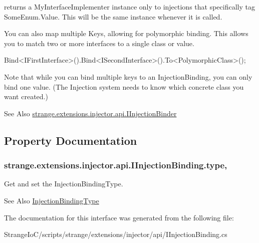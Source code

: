 returns a My\-Interface\-Implementer instance only to injections that specifically tag Some\-Enum.\-Value. This will be the same instance whenever it is called.

You can also map multiple Keys, allowing for polymorphic binding. This allows you to match two or more interfaces to a single class or value. \begin{DoxyVerb}Bind<IFirstInterface>().Bind<ISecondInterface>().To<PolymorphicClass>();
\end{DoxyVerb}


Note that while you can bind multiple keys to an Injection\-Binding, you can only bind one value. (The Injection system needs to know which concrete class you want created.)

\begin{DoxySeeAlso}{See Also}
\hyperlink{interfacestrange_1_1extensions_1_1injector_1_1api_1_1_i_injection_binder}{strange.\-extensions.\-injector.\-api.\-I\-Injection\-Binder} 
\end{DoxySeeAlso}


\subsection{Property Documentation}
\hypertarget{interfacestrange_1_1extensions_1_1injector_1_1api_1_1_i_injection_binding_ab79532f96a6a17f831559143066fed78}{
\subsubsection[{type}]{ strange.\-extensions.\-injector.\-api.\-I\-Injection\-Binding.\-type\hspace{0.3cm}{\ttfamily [get]}, {\ttfamily [set]}}}\label{interfacestrange_1_1extensions_1_1injector_1_1api_1_1_i_injection_binding_ab79532f96a6a17f831559143066fed78}


Get and set the Injection\-Binding\-Type. 

\begin{DoxySeeAlso}{See Also}
\hyperlink{namespacestrange_1_1extensions_1_1injector_1_1api_aaf5414484d7eccb5c502984bd70549ae}{Injection\-Binding\-Type} 
\end{DoxySeeAlso}


The documentation for this interface was generated from the following file\-:\begin{DoxyCompactItemize}
\item 
Strange\-Io\-C/scripts/strange/extensions/injector/api/I\-Injection\-Binding.\-cs\end{DoxyCompactItemize}
